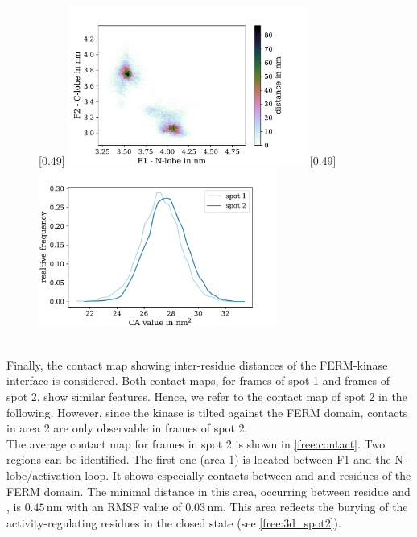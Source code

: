 \begin{figure}
	\subcaptionbox{\label{free:f2clf1nl}}[0.49\textwidth]{
		\includegraphics[height=5.2cm]{figures/results/free_f1f2}
	}\hfill%
	\subcaptionbox{\label{free:ca}}[0.49\textwidth]{
		\includegraphics[height=5.2cm]{figures/results/free_ca}
	}%
\end{figure}
%
%
%
\\
Finally, the contact map showing inter-residue distances of the FERM-kinase interface is considered. Both contact maps, for frames of spot 1 and frames of spot 2, show similar features. Hence, we refer to the contact map of spot 2 in the following. However, since the kinase is tilted against the FERM domain, contacts in area 2 are only observable in frames of spot 2.\\
The average contact map for frames in spot 2 is shown in \autoref{free:contact}. Two regions can be identified. The first one (area 1) is located between F1 and the N-lobe/activation loop. It shows especially contacts between  and  and residues of the FERM domain. The minimal distance in this area, occurring between residue  and , is $0.45\,\si{\nano\metre}$ with an RMSF value of $0.03\,\si{\nano\metre}$. This area reflects the burying of the activity-regulating residues in the closed state (see \autoref{free:3d_spot2}).\\
